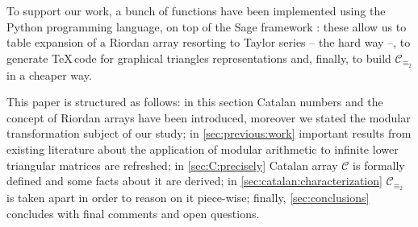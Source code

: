 To support our work, a bunch of functions have been implemented using the Python 
programming language, on top of the Sage framework 
\cite{sage}: these allow us to table expansion of a Riordan array
resorting to Taylor series -- the hard way --, to generate \TeX\,code
for graphical triangles representations and, finally, to build $\mathcal{C}_{\equiv_{2}}$ 
in a cheaper way.



This paper is structured as follows: in this section 
Catalan numbers and the concept of Riordan arrays have been introduced, moreover we stated the modular
transformation subject of our study; in \autoref{sec:previous:work} important
results from existing literature about the application of modular
arithmetic to infinite lower triangular matrices are refreshed;
in \autoref{sec:C:precisely} Catalan array $\mathcal{C}$ is formally defined
and some facts about it are derived; 
in \autoref{sec:catalan:characterization} $\mathcal{C}_{\equiv_{2}}$ is taken apart 
in order to reason on it piece-wise; finally, \autoref{sec:conclusions} concludes
with final comments and open questions.

